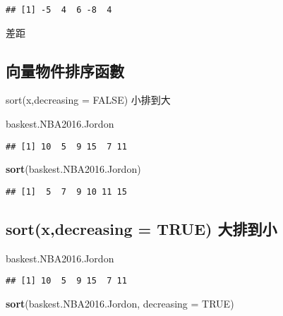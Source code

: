 \documentclass[]{article}
\newenvironment{Shaded}{\begin{snugshade}}{\end{snugshade}}
\newcommand{\DataTypeTok}[1]{\textcolor[rgb]{0.13,0.29,0.53}{#1}}
\newcommand{\KeywordTok}[1]{\textcolor[rgb]{0.13,0.29,0.53}{\textbf{#1}}}
\newcommand{\NormalTok}[1]{#1}
\newcommand{\OtherTok}[1]{\textcolor[rgb]{0.56,0.35,0.01}{#1}}
\begin{document}
\begin{verbatim}
## [1] -5  4  6 -8  4
\end{verbatim}

差距

\hypertarget{ux5411ux91cfux7269ux4ef6ux6392ux5e8fux51fdux6578}{%
\subsection{向量物件排序函數}\label{ux5411ux91cfux7269ux4ef6ux6392ux5e8fux51fdux6578}}

sort(x,decreasing = FALSE) 小排到大

\begin{Shaded}
\begin{Highlighting}[]
\NormalTok{baskest.NBA2016.Jordon}
\end{Highlighting}
\end{Shaded}

\begin{verbatim}
## [1] 10  5  9 15  7 11
\end{verbatim}

\begin{Shaded}
\begin{Highlighting}[]
\KeywordTok{sort}\NormalTok{(baskest.NBA2016.Jordon)}
\end{Highlighting}
\end{Shaded}

\begin{verbatim}
## [1]  5  7  9 10 11 15
\end{verbatim}

\hypertarget{sortxdecreasing-true-ux5927ux6392ux5230ux5c0f}{%
\subsection{sort(x,decreasing = TRUE)
大排到小}\label{sortxdecreasing-true-ux5927ux6392ux5230ux5c0f}}

\begin{Shaded}
\begin{Highlighting}[]
\NormalTok{baskest.NBA2016.Jordon}
\end{Highlighting}
\end{Shaded}

\begin{verbatim}
## [1] 10  5  9 15  7 11
\end{verbatim}

\begin{Shaded}
\begin{Highlighting}[]
\KeywordTok{sort}\NormalTok{(baskest.NBA2016.Jordon, }\DataTypeTok{decreasing =} \OtherTok{TRUE}\NormalTok{)}
\end{Highlighting}
\end{Shaded}
\end{document}
